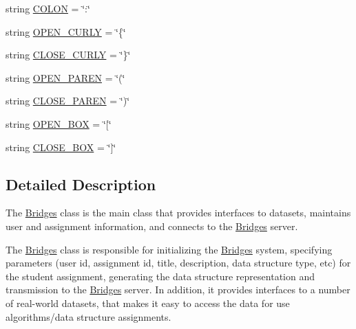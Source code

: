 \begin{DoxyCompactItemize}
\item 
string \mbox{\hyperlink{class_bridges_1_1_bridges_1_1_bridges_a0606ce0192b51d878e54a7d5ed639fcb}{C\+O\+L\+ON}} = \char`\"{}\+:\char`\"{}
\item 
string \mbox{\hyperlink{class_bridges_1_1_bridges_1_1_bridges_ad26eb626e32645acd1df4b7151fb80c5}{O\+P\+E\+N\+\_\+\+C\+U\+R\+LY}} = \char`\"{}\{\char`\"{}
\item 
string \mbox{\hyperlink{class_bridges_1_1_bridges_1_1_bridges_a460ec6a9b83237b9a44a09beea04a519}{C\+L\+O\+S\+E\+\_\+\+C\+U\+R\+LY}} = \char`\"{}\}\char`\"{}
\item 
string \mbox{\hyperlink{class_bridges_1_1_bridges_1_1_bridges_a0224c42589b48d2d24168b15a38735ad}{O\+P\+E\+N\+\_\+\+P\+A\+R\+EN}} = \char`\"{}(\char`\"{}
\item 
string \mbox{\hyperlink{class_bridges_1_1_bridges_1_1_bridges_afc31ec8269be6f57b1d2c1a1959c040f}{C\+L\+O\+S\+E\+\_\+\+P\+A\+R\+EN}} = \char`\"{})\char`\"{}
\item 
string \mbox{\hyperlink{class_bridges_1_1_bridges_1_1_bridges_ae94282f19974a947191a34c30865c202}{O\+P\+E\+N\+\_\+\+B\+OX}} = \char`\"{}\mbox{[}\char`\"{}
\item 
string \mbox{\hyperlink{class_bridges_1_1_bridges_1_1_bridges_abd16a70d55fbcf24b1a29536aae08c7b}{C\+L\+O\+S\+E\+\_\+\+B\+OX}} = \char`\"{}\mbox{]}\char`\"{}
\end{DoxyCompactItemize}


\subsection{Detailed Description}
The \mbox{\hyperlink{class_bridges_1_1_bridges_1_1_bridges}{Bridges}} class is the main class that provides interfaces to datasets, maintains user and assignment information, and connects to the \mbox{\hyperlink{class_bridges_1_1_bridges_1_1_bridges}{Bridges}} server. 

The \mbox{\hyperlink{class_bridges_1_1_bridges_1_1_bridges}{Bridges}} class is responsible for initializing the \mbox{\hyperlink{class_bridges_1_1_bridges_1_1_bridges}{Bridges}} system, specifying parameters (user id, assignment id, title, description, data structure type, etc) for the student assignment, generating the data structure representation and transmission to the \mbox{\hyperlink{class_bridges_1_1_bridges_1_1_bridges}{Bridges}} server. In addition, it provides interfaces to a number of real-\/world datasets, that makes it easy to access the data for use algorithms/data structure assignments. ~\newline



